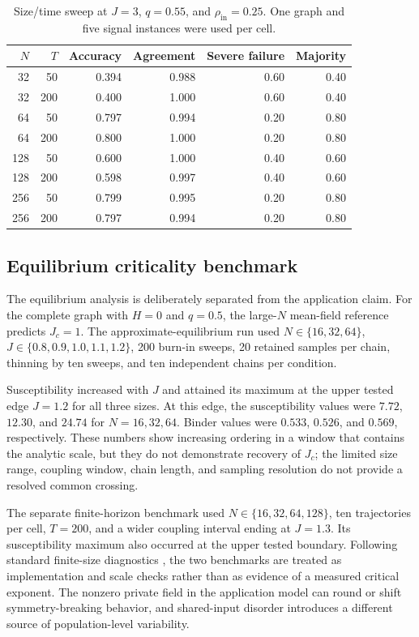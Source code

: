 \documentclass[11pt,a4paper]{article}
\begin{document}
\begin{table}[htbp]
\centering
\caption{Size/time sweep at $J=3$, $q=0.55$, and $\rho_{\mathrm{in}}=0.25$. One graph and five signal instances were used per cell.}
\label{tab:scaling}
\small
\begin{tabular}{@{}rrr rr r@{}}
\toprule
$N$ & $T$ & Accuracy & Agreement & Severe failure & Majority \\
\midrule
32 & 50 & 0.394 & 0.988 & 0.60 & 0.40 \\
32 & 200 & 0.400 & 1.000 & 0.60 & 0.40 \\
64 & 50 & 0.797 & 0.994 & 0.20 & 0.80 \\
64 & 200 & 0.800 & 1.000 & 0.20 & 0.80 \\
128 & 50 & 0.600 & 1.000 & 0.40 & 0.60 \\
128 & 200 & 0.598 & 0.997 & 0.40 & 0.60 \\
256 & 50 & 0.799 & 0.995 & 0.20 & 0.80 \\
256 & 200 & 0.797 & 0.994 & 0.20 & 0.80 \\
\bottomrule
\end{tabular}
\end{table}

\subsection{Equilibrium criticality benchmark}

The equilibrium analysis is deliberately separated from the application claim. For the complete graph with $H=0$ and $q=0.5$, the large-$N$ mean-field reference predicts $J_c=1$. The approximate-equilibrium run used $N\in\{16,32,64\}$, $J\in\{0.8,0.9,1.0,1.1,1.2\}$, 200 burn-in sweeps, 20 retained samples per chain, thinning by ten sweeps, and ten independent chains per condition.

Susceptibility increased with $J$ and attained its maximum at the upper tested edge $J=1.2$ for all three sizes. At this edge, the susceptibility values were $7.72$, $12.30$, and $24.74$ for $N=16,32,64$. Binder values were $0.533$, $0.526$, and $0.569$, respectively. These numbers show increasing ordering in a window that contains the analytic scale, but they do not demonstrate recovery of $J_c$; the limited size range, coupling window, chain length, and sampling resolution do not provide a resolved common crossing.

The separate finite-horizon benchmark used $N\in\{16,32,64,128\}$, ten trajectories per cell, $T=200$, and a wider coupling interval ending at $J=1.3$. Its susceptibility maximum also occurred at the upper tested boundary. Following standard finite-size diagnostics \citep{binder1981,hong2007}, the two benchmarks are treated as implementation and scale checks rather than as evidence of a measured critical exponent. The nonzero private field in the application model can round or shift symmetry-breaking behavior, and shared-input disorder introduces a different source of population-level variability.
\end{document}
